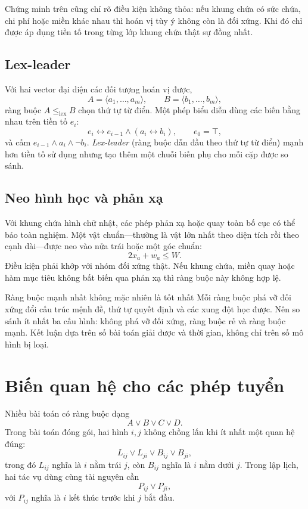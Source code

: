 Chứng minh trên cũng chỉ rõ điều kiện không thỏa: nếu khung chứa có sức chứa, chi phí hoặc
miền khác nhau thì hoán vị tùy ý không còn là đối xứng. Khi đó chỉ được áp
dụng tiền tố trong từng lớp khung chứa thật sự đồng nhất.

\subsection{Lex-leader}

Với hai vector đại diện các đối tượng hoán vị được,
\[
  A=\langle a_1,\ldots,a_m\rangle,\qquad
  B=\langle b_1,\ldots,b_m\rangle,
\]
ràng buộc \(A\le_{\mathrm{lex}}B\) chọn thứ tự từ điển. Một phép biểu diễn dùng
các biến bằng nhau trên tiền tố \(e_i\):
\[
  e_i\leftrightarrow e_{i-1}\land(a_i\leftrightarrow b_i),
  \qquad e_0=\top,
\]
và cấm \(e_{i-1}\land a_i\land\neg b_i\). \emph{Lex-leader} (ràng buộc dẫn
đầu theo thứ tự từ điển) mạnh hơn tiền tố sử dụng nhưng tạo thêm một chuỗi biến
phụ cho mỗi cặp được so sánh.

\subsection{Neo hình học và phản xạ}

Với khung chứa hình chữ nhật, các phép phản xạ hoặc quay toàn bố cục có thể bảo
toàn nghiệm. Một vật chuẩn---thường là vật lớn nhất theo diện tích rồi theo
cạnh dài---được neo vào nửa trái hoặc một góc chuẩn:
\[
  2x_a+w_a\le W.
\]
Điều kiện phải khớp với nhóm đối xứng thật. Nếu khung chứa, miền quay hoặc hàm
mục tiêu không bất biến qua phản xạ thì ràng buộc này không hợp lệ.

\begin{keyidea}{Ràng buộc mạnh nhất không mặc nhiên là tốt nhất}
Mỗi ràng buộc phá vỡ đối xứng đổi cấu trúc mệnh đề, thứ tự quyết định và các xung
đột học được. Nên so sánh ít nhất ba cấu hình: không phá vỡ đối xứng, ràng buộc rẻ
và ràng buộc mạnh. Kết luận dựa trên số bài toán giải được và thời gian, không
chỉ trên số mô hình bị
loại.
\end{keyidea}

\section{Biến quan hệ cho các phép tuyển}

Nhiều bài toán có ràng buộc dạng
\[
  A\lor B\lor C\lor D.
\]
Trong bài toán đóng gói, hai hình \(i,j\) không chồng lấn khi ít nhất một quan hệ đúng:
\[
  L_{ij}\lor L_{ji}\lor B_{ij}\lor B_{ji},
\]
trong đó \(L_{ij}\) nghĩa là \(i\) nằm trái \(j\), còn \(B_{ij}\) nghĩa là
\(i\) nằm dưới \(j\). Trong lập lịch, hai tác vụ dùng cùng tài nguyên cần
\[
  P_{ij}\lor P_{ji},
\]
với \(P_{ij}\) nghĩa là \(i\) kết thúc trước khi \(j\) bắt đầu.

